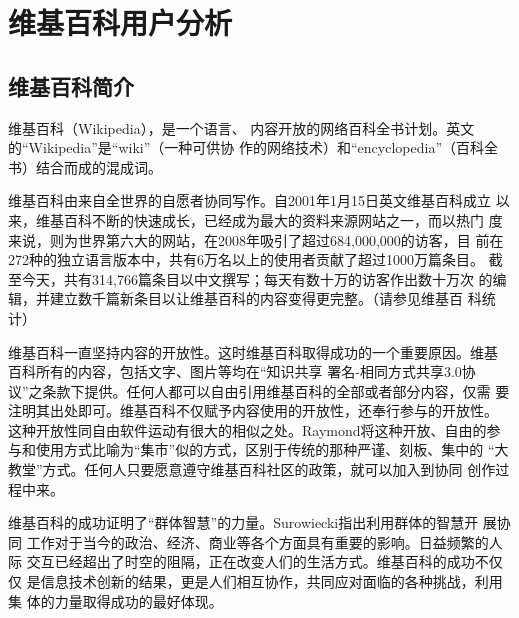 
\chapter{维基百科用户分析}
\label{cha:wikipedian}

\section{维基百科简介}
维基百科（Wikipedia），是一个语言、
内容开放的网络百科全书计划。英文的“Wikipedia”是“wiki”（一种可供协
作的网络技术）和“encyclopedia”（百科全书）结合而成的混成词。

维基百科由来自全世界的自愿者协同写作。自2001年1月15日英文维基百科成立
以来，维基百科不断的快速成长，已经成为最大的资料来源网站之一，而以热门
度来说，则为世界第六大的网站，在2008年吸引了超过684,000,000的访客，目
前在272种的独立语言版本中，共有6万名以上的使用者贡献了超过1000万篇条目。
截至今天，共有314,766篇条目以中文撰写；每天有数十万的访客作出数十万次
的编辑，并建立数千篇新条目以让维基百科的内容变得更完整。（请参见维基百
科统计）

维基百科一直坚持内容的开放性。这时维基百科取得成功的一个重要原因。维基
百科所有的内容，包括文字、图片等均在“知识共享 署名-相同方式共享3.0协
议”之条款下提供。任何人都可以自由引用维基百科的全部或者部分内容，仅需
要注明其出处即可。维基百科不仅赋予内容使用的开放性，还奉行参与的开放性。
这种开放性同自由软件运动有很大的相似之处。Raymond将这种开放、自由的参
与和使用方式比喻为“集市”似的方式，区别于传统的那种严谨、刻板、集中的
“大教堂”方式。任何人只要愿意遵守维基百科社区的政策，就可以加入到协同
创作过程中来\cite{raymond1999cab}。

维基百科的成功证明了“群体智慧”的力量。Surowiecki指出利用群体的智慧开
展协同
工作对于当今的政治、经济、商业等各个方面具有重要的影响。日益频繁的人际
交互已经超出了时空的阻隔，正在改变人们的生活方式。维基百科的成功不仅仅
是信息技术创新的结果，更是人们相互协作，共同应对面临的各种挑战，利用集
体的力量取得成功的最好体现\cite{surowiecki:190}。



